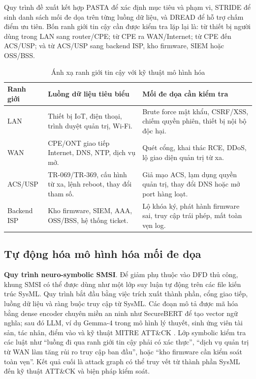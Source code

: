 \documentclass[../DoAn.tex]{subfiles}
\begin{document}
Quy trình đề xuất kết hợp PASTA để xác định mục tiêu và phạm vi, STRIDE để sinh danh sách mối đe dọa trên từng luồng dữ liệu, và DREAD để hỗ trợ chấm điểm ưu tiên. Bốn ranh giới tin cậy cần được kiểm tra lặp lại là: từ thiết bị người dùng trong LAN sang router/CPE; từ CPE ra WAN/Internet; từ CPE đến ACS/USP; và từ ACS/USP sang backend ISP, kho firmware, SIEM hoặc OSS/BSS.

\begin{table}[H]
\centering
\begin{tabular}{|p{3cm}|p{4.4cm}|p{5.4cm}|}
\hline
\textbf{Ranh giới} & \textbf{Luồng dữ liệu tiêu biểu} & \textbf{Mối đe dọa cần kiểm tra} \\ \hline
LAN & Thiết bị IoT, điện thoại, trình duyệt quản trị, Wi-Fi. & Brute force mật khẩu, CSRF/XSS, chiếm quyền phiên, thiết bị nội bộ độc hại. \\ \hline
WAN & CPE/ONT giao tiếp Internet, DNS, NTP, dịch vụ mở. & Quét cổng, khai thác RCE, DDoS, lộ giao diện quản trị từ xa. \\ \hline
ACS/USP & TR-069/TR-369, cấu hình từ xa, lệnh reboot, thay đổi tham số. & Giả mạo ACS, lạm dụng quyền quản trị, thay đổi DNS hoặc mở port hàng loạt. \\ \hline
Backend ISP & Kho firmware, SIEM, AAA, OSS/BSS, hệ thống ticket. & Lộ khóa ký, phát hành firmware sai, truy cập trái phép, mất toàn vẹn log. \\ \hline
\end{tabular}
\caption{Ánh xạ ranh giới tin cậy với kỹ thuật mô hình hóa}
\label{tab:trust-boundaries}
\end{table}

\subsection{Tự động hóa mô hình hóa mối đe dọa}
\textbf{Quy trình neuro-symbolic SMSI}. Để giảm phụ thuộc vào DFD thủ công, khung SMSI \cite{smsi2025} có thể được dùng như một lớp suy luận tự động trên các file kiến trúc SysML. Quy trình bắt đầu bằng việc trích xuất thành phần, cổng giao tiếp, luồng dữ liệu và ràng buộc truy cập từ SysML. Các đoạn mô tả được mã hóa bằng dense encoder chuyên miền an ninh như SecureBERT để tạo vector ngữ nghĩa; sau đó LLM, ví dụ Gemma-4 trong mô hình lý thuyết, sinh ứng viên tài sản, tác nhân, điểm vào và kỹ thuật MITRE ATT\&CK \cite{mitreattackiot}. Lớp symbolic kiểm tra các luật như ``luồng đi qua ranh giới tin cậy phải có xác thực'', ``dịch vụ quản trị từ WAN làm tăng rủi ro truy cập ban đầu'', hoặc ``kho firmware cần kiểm soát toàn vẹn''. Kết quả cuối là attack graph có thể truy vết từ thành phần SysML đến kỹ thuật ATT\&CK và biện pháp kiểm soát.
\end{document}
